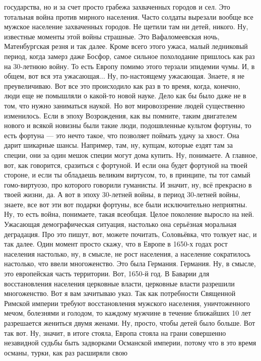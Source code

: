 государства, но и за счет просто грабежа захваченных городов и сел. Это
тотальная война против мирного населения. Часто солдаты вырезали вообще все
мужское население захваченных городов. Не щетили там ни детей, никого. Ну,
известные моменты этой войны страшные. Это Вафаломеевская ночь, Матенбургская
резня и так далее. Кроме всего этого ужаса, малый ледниковый период, когда
замерз даже Босфор, самое сильное похолодание пришлось как раз на 30-летнюю
войну. То есть Европу помимо этого терзали эпидемии чумы. И, в общем, вот вся
эта ужасающая... Ну, по-настоящему ужасающая. Знаете, я не преувеличиваю. Вот
все это происходило как раз в то время, когда, конечно, люди еще не помышляли о
какой-то новой науке. Дело как бы было даже не в том, что нужно заниматься
наукой. Но вот мировоззрение людей существенно изменилось. Если в эпоху
Возрождения, как вы помните, таким двигателем нового и всякой новизны были такие
люди, подошвленные культом фортуны, то есть фортуна — это нечто такое, что
позволяет поймать удачу за хвост. Она дарит шикарные шансы. Например, там, ну,
купцам, которые ездят там за специи, они за один мешок специи могут дома купить.
Ну, понимаете. А главное, вот, как говорится, сразиться с фортуной. И если она
будет фортуной на твоей стороне, и если ты обладаешь великим виртусом, то, в
принципе, ты тот самый гомо-виртуозо, про которого говорили гуманисты. И значит,
ну, всё прекрасно в твоей жизни, да. А вот в эпоху 30-летней войны, в период
30-летней войны, знаете, все вот эти вот подарки фортуны, все были исключительно
неприятны. Ну, то есть война, понимаете, такая всеобщая. Целое поколение выросло
на ней. Ужасающая демографическая ситуация, настолько она серьёзная моральная
деградация. Про это пишут, вот, можете почитать, Соловьёвка, что толкует нас, и
так далее. Один момент просто скажу, что в Европе в 1650-х годах рост населения
настолько, ну, в смысле, не рост населения, а население сократилось настолько,
что ввели многоженство. Это была Германия. Германия. Ну, в смысле, это
европейская часть территории. Вот, 1650-й год. В Баварии для восстановления
населения церковные власти, церковные власти разрешили многоженство. Вот я вам
зачитываю указ. Так как потребности Священной Римской империи требуют
восстановления мужского населения, уничтоженного мечом, болезнями и голодом, то
каждому мужчине в течение ближайших 10 лет разрешается жениться двумя женами.
Ну, просто, чтобы детей было больше. Вот так вот. Ну, значит, в итоге стояла,
Европа стояла на грани совершенно незавидной судьбы быть задворками Османской
империи, потому что в это время османы, турки, как раз расширяли свою
